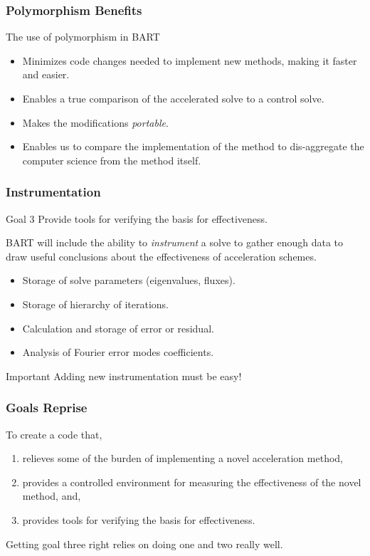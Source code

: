 \documentclass[xcolor=x11names, compress]{beamer}
\begin{document}
\begin{frame}
  \frametitle{Polymorphism Benefits}
  The use of polymorphism in BART
  \begin{itemize}
  \item<1-> Minimizes code changes needed to implement new methods,
    making it faster and easier.
  \item<2-> Enables a true comparison of the accelerated solve to a
    control solve.
  \item<3-> Makes the modifications \textit{portable}.    
  \item<4-> Enables us to compare the implementation of the method to
    dis-aggregate the computer science from the method itself.
  \end{itemize}
 
\end{frame}
\begin{frame}
  \frametitle{Instrumentation}
  \pause
  \begin{block}{Goal 3}
    Provide tools for verifying the basis for effectiveness.
  \end{block}
  \pause
  BART will include the ability to \textit{instrument} a solve
  to gather enough data to draw useful conclusions about the effectiveness of
  acceleration schemes.
  \pause
\begin{itemize}
  \item Storage of solve parameters (eigenvalues, fluxes).
  \item Storage of hierarchy of iterations.
  \item Calculation and storage of error or residual.
  \item Analysis of Fourier error modes coefficients.
  \end{itemize}
\pause
  \begin{block}{Important}
    Adding new instrumentation must be easy!
  \end{block}
\end{frame}
\begin{frame}
  \frametitle{Goals Reprise}
  To create a code that, 
  \vspace{1em}
  \begin{enumerate}
    \setlength\itemsep{1em}
  \item relieves some of the burden of implementing a novel acceleration method,
  \item provides a controlled environment for measuring the
    effectiveness of the novel method, and,
  \item provides tools for verifying the basis for effectiveness.
  \end{enumerate}

  \begin{block}
    Getting goal three right relies on doing one and two really well.
  \end{block}
\end{frame}
\end{document}
